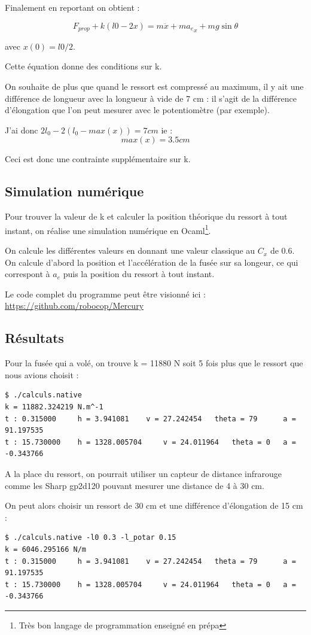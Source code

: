 \documentclass[a4paper,12pt]{scrartcl}
\begin{document}
Finalement en reportant on obtient : 

$$F_{prop} + k(l0-2x) = m \ddot{x}+m{a_e}_x +mg\sin{\theta}$$ 

avec $x(0) = l0/2$.

Cette équation donne des conditions sur k.

On souhaite de plus que quand le ressort est compressé au maximum, il y ait une différence de longueur avec la longueur à vide de 7 cm : il s'agit de la différence d'élongation que l'on peut mesurer avec le potentiomètre (par exemple).

J'ai donc $2 l_0 - 2(l_0-max(x)) = 7cm$ ie : $$max(x) = 3.5 cm$$


Ceci est donc une contrainte supplémentaire sur k.

\subsection{Simulation numérique}

Pour trouver la valeur de k et calculer la position théorique du ressort à tout instant, on réalise une simulation numérique en Ocaml\footnote{Très bon langage de programmation enseigné en prépa}.

On calcule les différentes valeurs en donnant une valeur classique au $C_x$ de 0.6.
On calcule d'abord la position et l'accélération de la fusée sur sa longeur, ce qui correspont à ${a_e}$ puis la position du ressort à tout instant.

Le code complet du programme peut être visionné ici : \url{https://github.com/robocop/Mercury}

\subsection{Résultats}

Pour la fusée qui a volé, on trouve k = 11880 N soit 5 fois plus que le ressort que nous avions choisit : 
\begin{lstlisting}
$ ./calculs.native 
k = 11882.324219 N.m^-1
t : 0.315000 	 h = 3.941081 	 v = 27.242454 	 theta = 79 	 a = 91.197535 
t : 15.730000 	 h = 1328.005704 	 v = 24.011964 	 theta = 0	 a = -0.343766 
\end{lstlisting}

A la place du ressort, on pourrait utiliser un capteur de distance infrarouge comme les Sharp gp2d120 pouvant mesurer une distance de 
4 à 30 cm.

On peut alors choisir un ressort de 30 cm et une différence d'élongation de 15 cm : 
\begin{lstlisting}
$ ./calculs.native -l0 0.3 -l_potar 0.15
k = 6046.295166 N/m
t : 0.315000 	 h = 3.941081 	 v = 27.242454 	 theta = 79 	 a = 91.197535 
t : 15.730000 	 h = 1328.005704 	 v = 24.011964 	 theta = 0 	 a = -0.343766 
\end{lstlisting}
\end{document}
